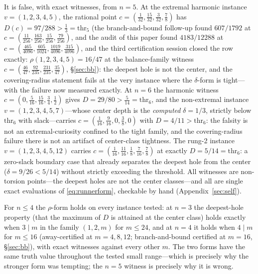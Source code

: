It is false, with exact witnesses, from $n=5$. At the extremal harmonic
instance $v=(1,2,3,4,5)$, the rational point
$c=(\tfrac1{32},\tfrac{15}{32},\tfrac3{32},\tfrac78)$ has
$D(c)=97/288>\tfrac13=\mathrm{thr}_5$ (the branch-and-bound follow-up
found $607/1792$ at
$c=(\tfrac{11}{256},\tfrac{163}{256},\tfrac{15}{256},
\tfrac{79}{256})$, and the audit of this paper found
$4183/12288$ at
$c=(\tfrac{465}{4096},\tfrac{605}{1024},\tfrac{1019}{4096},
\tfrac{315}{4096})$, and the third certification session closed the row
exactly: $\rho(1,2,3,4,5)=16/47$ at the balance-family witness
$c=(\tfrac{46}{47},\tfrac{92}{235},\tfrac{231}{235},\tfrac{35}{47})$,
\S\ref{sec:bb}): the deepest hole is not the center, and the
covering-radius statement fails at the very instance where the
$\delta$-form is tight---with the failure now measured exactly. At $n=6$ the harmonic witness
$c=(0,\tfrac5{16},\tfrac{15}{16},\tfrac34,\tfrac12)$ gives
$D=29/80>\tfrac5{14}=\mathrm{thr}_6$, and the non-extremal instance
$v=(1,2,3,4,5,7)$---whose center depth is the \emph{computed}
$\delta=1/3$, strictly below $\mathrm{thr}_6$ with slack---carries
$c=(\tfrac1{16},\tfrac9{16},0,\tfrac38,0)$
with $D=4/11>\mathrm{thr}_6$: the falsity is not an extremal-curiosity
confined to the tight family, and the covering-radius failure there is
not an artifact of center-class tightness. The rung-2 instance
$v=(1,2,3,4,5,12)$ carries $c=(\tfrac1{16},\tfrac{11}{16},\tfrac18,
\tfrac7{16},\tfrac78)$ at exactly $D=5/14=\mathrm{thr}_6$: a
zero-slack boundary case that already separates the deepest hole from
the center ($\delta=9/26<5/14$) without strictly exceeding the
threshold. All witnesses are non-torsion points---the deepest holes are
not the center classes---and all are single exact evaluations of
\eqref{eq:runnerform}, checkable by hand (Appendix~\ref{sec:self}).

For $n\le4$ the $\rho$-form holds on every instance tested: at $n=3$
the deepest-hole property (that the maximum of $D$ is attained at the
center class) holds exactly when $3\mid m$ in the family
$(1,2,m)$ for $m\le24$, and at $n=4$ it holds when $4\mid m$ for
$m\le16$ (away-certified at $m=4,8,12$; branch-and-bound certified at
$m=16$, \S\ref{sec:bb}), with exact witnesses against every other $m$.
The two forms have the same truth value throughout the tested small
range---which is precisely why the stronger form was tempting; the
$n=5$ witness is precisely why it is wrong.

